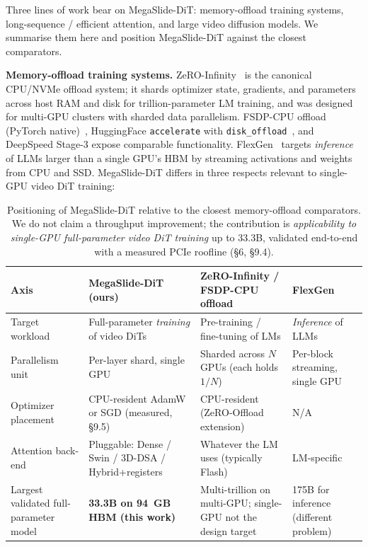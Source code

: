 \documentclass[11pt, letterpaper]{article}
\begin{document}
Three lines of work bear on MegaSlide-DiT: memory-offload training systems, long-sequence / efficient attention, and large video diffusion models. We summarise them here and position MegaSlide-DiT against the closest comparators.

\textbf{Memory-offload training systems.} ZeRO-Infinity~\cite{rajbhandari2021zero} is the canonical CPU/NVMe offload system; it shards optimizer state, gradients, and parameters across host RAM and disk for trillion-parameter LM training, and was designed for multi-GPU clusters with sharded data parallelism. FSDP-CPU offload (PyTorch native)~\cite{zhao2023fsdp}, HuggingFace \texttt{accelerate} with \texttt{disk\_offload}~\cite{accelerate2022}, and DeepSpeed Stage-3 expose comparable functionality. FlexGen~\cite{sheng2023flexgen} targets \emph{inference} of LLMs larger than a single GPU's HBM by streaming activations and weights from CPU and SSD. MegaSlide-DiT differs in three respects relevant to single-GPU video DiT training:

\begin{table}[h]
\centering
\small
\begin{tabular}{p{2.6cm}p{4.0cm}p{4.0cm}p{3.4cm}}
\toprule
\textbf{Axis} & \textbf{MegaSlide-DiT (ours)} & \textbf{ZeRO-Infinity / FSDP-CPU offload} & \textbf{FlexGen} \\
\midrule
Target workload & Full-parameter \emph{training} of video DiTs & Pre-training / fine-tuning of LMs & \emph{Inference} of LLMs \\
Parallelism unit & Per-layer shard, single GPU & Sharded across $N$ GPUs (each holds $1/N$) & Per-block streaming, single GPU \\
Optimizer placement & CPU-resident AdamW or SGD (measured, \S9.5) & CPU-resident (ZeRO-Offload extension) & N/A \\
Attention back-end & Pluggable: Dense / Swin / 3D-DSA / Hybrid+registers & Whatever the LM uses (typically Flash) & LM-specific \\
Largest validated full-parameter model & \textbf{33.3B on 94~GB HBM (this work)} & Multi-trillion on multi-GPU; single-GPU not the design target & 175B for inference (different problem) \\
\bottomrule
\end{tabular}
\caption{Positioning of MegaSlide-DiT relative to the closest memory-offload comparators. We do not claim a throughput improvement; the contribution is \emph{applicability to single-GPU full-parameter video DiT training} up to 33.3B, validated end-to-end with a measured PCIe roofline (\S6, \S9.4).}
\label{tab:positioning}
\end{table}
\end{document}
